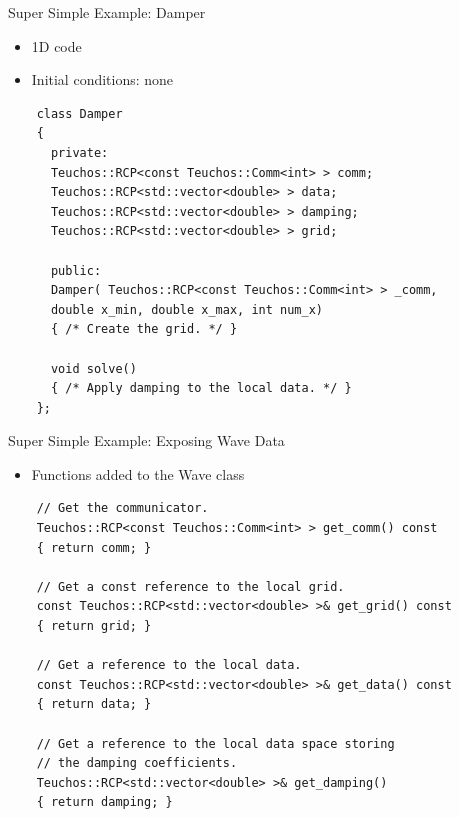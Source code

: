 \documentclass{beamer}
\begin{document}
\begin{frame}[fragile]{Super Simple Example: Damper}

  \begin{itemize}
  \item 1D code
  \item Initial conditions: none
  \end{itemize}

  \begin{lstlisting}
    class Damper
    {
      private:
      Teuchos::RCP<const Teuchos::Comm<int> > comm;
      Teuchos::RCP<std::vector<double> > data;
      Teuchos::RCP<std::vector<double> > damping;
      Teuchos::RCP<std::vector<double> > grid;

      public:
      Damper( Teuchos::RCP<const Teuchos::Comm<int> > _comm,
      double x_min, double x_max, int num_x)
      { /* Create the grid. */ }

      void solve()
      { /* Apply damping to the local data. */ }
    };
  \end{lstlisting}

\end{frame}

\begin{frame}[fragile]{Super Simple Example: Exposing Wave Data}

  \begin{itemize}
  \item Functions added to the Wave class
  \end{itemize}

  \begin{lstlisting}
    // Get the communicator.
    Teuchos::RCP<const Teuchos::Comm<int> > get_comm() const
    { return comm; }

    // Get a const reference to the local grid.
    const Teuchos::RCP<std::vector<double> >& get_grid() const
    { return grid; }

    // Get a reference to the local data.
    const Teuchos::RCP<std::vector<double> >& get_data() const
    { return data; }

    // Get a reference to the local data space storing 
    // the damping coefficients.
    Teuchos::RCP<std::vector<double> >& get_damping()
    { return damping; }
  \end{lstlisting}

\end{frame}
\end{document}
